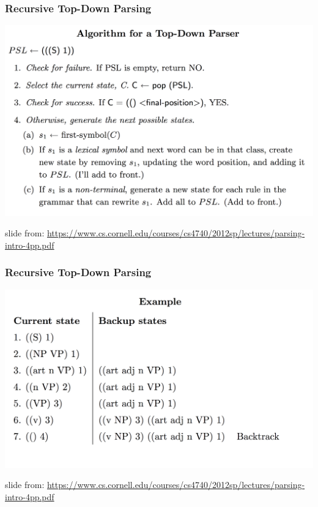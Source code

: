 \documentclass{beamer}
\begin{document}
\begin{frame}
\frametitle{Recursive Top-Down Parsing}
\includegraphics[width=\textwidth]{figures/top3}

{\tiny slide from: \url{https://www.cs.cornell.edu/courses/cs4740/2012sp/lectures/parsing-intro-4pp.pdf}}

\end{frame}

\begin{frame}
\frametitle{Recursive Top-Down Parsing}
\includegraphics[width=\textwidth]{figures/top4}

{\tiny slide from: \url{https://www.cs.cornell.edu/courses/cs4740/2012sp/lectures/parsing-intro-4pp.pdf}}

\end{frame}
\end{document}
